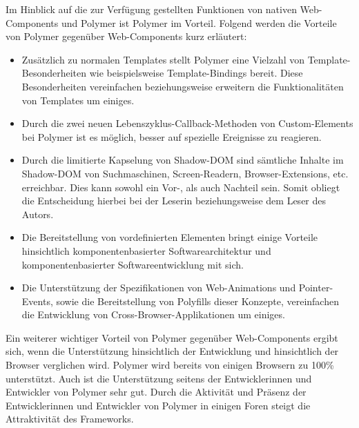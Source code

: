 Im Hinblick auf die zur Verfügung gestellten Funktionen von nativen Web-Components und Polymer ist Polymer im Vorteil. Folgend werden die Vorteile von Polymer gegenüber Web-Components kurz erläutert:
\begin{itemize}
\item Zusätzlich zu normalen Templates stellt Polymer eine Vielzahl von Template-Besonderheiten wie beispielsweise Template-Bindings bereit. Diese Besonderheiten vereinfachen beziehungsweise erweitern die Funktionalitäten von Templates um einiges.
\item Durch die zwei neuen Lebenszyklus-Callback-Methoden von Custom-Elements bei Polymer ist es möglich, besser auf spezielle Ereignisse zu reagieren.
\item Durch die limitierte Kapselung von Shadow-DOM sind sämtliche Inhalte im Shadow-DOM von Suchmaschinen, Screen-Readern, Browser-Extensions, etc. erreichbar. Dies kann sowohl ein Vor-, als auch Nachteil sein. Somit obliegt die Entscheidung hierbei bei der Leserin beziehungsweise dem Leser des Autors.
\item Die Bereitstellung von vordefinierten Elementen bringt einige Vorteile hinsichtlich komponentenbasierter Softwarearchitektur und komponentenbasierter Softwareentwicklung mit sich.
\item Die Unterstützung der Spezifikationen von Web-Animations und Pointer-Events, sowie die Bereitstellung von Polyfills dieser Konzepte, vereinfachen die Entwicklung von Cross-Browser-Applikationen um einiges.
\end{itemize}

Ein weiterer wichtiger Vorteil von Polymer gegenüber Web-Components ergibt sich, wenn die Unterstützung hinsichtlich der Entwicklung und hinsichtlich der Browser verglichen wird. Polymer wird bereits von einigen Browsern zu 100\% unterstützt. Auch ist die Unterstützung seitens der Entwicklerinnen und Entwickler von Polymer sehr gut. Durch die Aktivität und Präsenz der Entwicklerinnen und Entwickler von Polymer in einigen Foren steigt die Attraktivität des Frameworks.